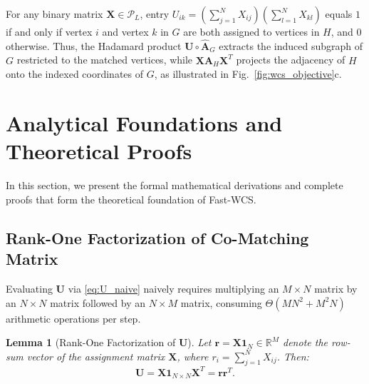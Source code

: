 \documentclass[conference]{IEEEtran}
\newtheorem{lemma}{Lemma}
\begin{document}
For any binary matrix $\mathbf{X} \in \mathcal{P}_L$, entry $U_{ik} = (\sum_{j=1}^N X_{ij})(\sum_{l=1}^N X_{kl})$ equals $1$ if and only if vertex $i$ and vertex $k$ in $G$ are both assigned to vertices in $H$, and $0$ otherwise. Thus, the Hadamard product $\mathbf{U} \circ \hat{\mathbf{A}}_G$ extracts the induced subgraph of $G$ restricted to the matched vertices, while $\mathbf{X}\hat{\mathbf{A}}_H\mathbf{X}^T$ projects the adjacency of $H$ onto the indexed coordinates of $G$, as illustrated in Fig.~\ref{fig:wcs_objective}c.


\section{Analytical Foundations and Theoretical Proofs}
\label{sec:theory}

In this section, we present the formal mathematical derivations and complete proofs that form the theoretical foundation of Fast-WCS.

\subsection{Rank-One Factorization of Co-Matching Matrix}

Evaluating $\mathbf{U}$ via \eqref{eq:U_naive} naively requires multiplying an $M \times N$ matrix by an $N \times N$ matrix followed by an $N \times M$ matrix, consuming $\Theta(MN^2 + M^2N)$ arithmetic operations per step.

\begin{lemma}[Rank-One Factorization of $\mathbf{U}$]
\label{lem:rank1}
Let $\mathbf{r} = \mathbf{X}\mathbf{1}_N \in \mathbb{R}^M$ denote the row-sum vector of the assignment matrix $\mathbf{X}$, where $r_i = \sum_{j=1}^N X_{ij}$. Then:
\begin{equation}
\mathbf{U} = \mathbf{X}\mathbf{1}_{N\times N}\mathbf{X}^T = \mathbf{r}\mathbf{r}^T.
\label{eq:lemma1_result}
\end{equation}
\end{lemma}
\end{document}
